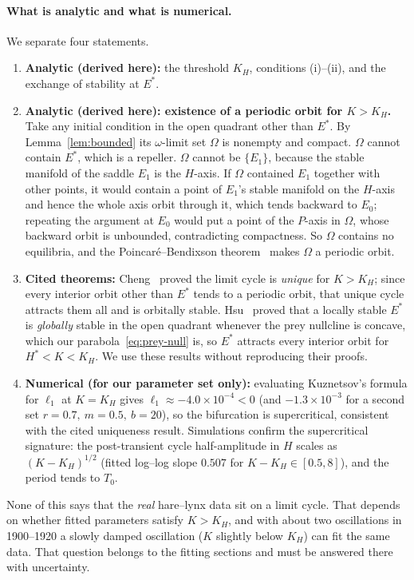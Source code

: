 \paragraph{What is analytic and what is numerical.} We separate four statements.
\begin{enumerate}
\item \textbf{Analytic (derived here):} the threshold $K_H$, conditions (i)--(ii), and the
exchange of stability at $E^*$.
\item \textbf{Analytic (derived here): existence of a periodic orbit for $K>K_H$.}
Take any initial condition in the open quadrant other than $E^*$. By Lemma~\ref{lem:bounded} its $\omega$-limit
set $\Omega$ is nonempty and compact. $\Omega$ cannot contain $E^*$, which is a repeller.
$\Omega$ cannot be $\{E_1\}$, because the stable manifold of the saddle $E_1$ is the $H$-axis.
If $\Omega$ contained $E_1$ together with other points, it would contain a point of $E_1$'s
stable manifold on the $H$-axis and hence the whole axis orbit through it, which tends backward
to $E_0$; repeating the argument at $E_0$ would put a point of the $P$-axis in $\Omega$, whose
backward orbit is unbounded, contradicting compactness. So $\Omega$ contains no equilibria, and
the Poincar\'e--Bendixson theorem~\cite{strogatz2015} makes $\Omega$ a periodic orbit.
\item \textbf{Cited theorems:} Cheng~\cite{cheng1981} proved the limit cycle is \emph{unique} for
$K>K_H$; since every interior orbit other than $E^*$ tends to a periodic orbit, that unique cycle
attracts them all and is orbitally stable. Hsu~\cite{hsu1978} proved that a locally stable $E^*$
is \emph{globally} stable in the open quadrant whenever the prey nullcline is concave, which our
parabola~\eqref{eq:prey-null} is, so $E^*$ attracts every interior orbit for $H^*<K<K_H$.
We use these results without reproducing their proofs.
\item \textbf{Numerical (for our parameter set only):} evaluating Kuznetsov's formula for
$\ell_1$ at $K=K_H$ gives $\ell_1\approx-4.0\times10^{-4}<0$ (and $-1.3\times10^{-3}$ for a second
set $r=0.7,\ m=0.5,\ b=20$), so the bifurcation is supercritical, consistent with the cited
uniqueness result. Simulations confirm the supercritical signature: the post-transient cycle
half-amplitude in $H$ scales as $(K-K_H)^{1/2}$ (fitted log--log slope $0.507$ for
$K-K_H\in[0.5,8]$), and the period tends to $T_0$.
\end{enumerate}

\noindent None of this says that the \emph{real} hare--lynx data sit on a limit cycle. That
depends on whether fitted parameters satisfy $K>K_H$, and with about two oscillations in
1900--1920 a slowly damped oscillation ($K$ slightly below $K_H$) can fit the same data.
That question belongs to the fitting sections and must be answered there with uncertainty.

